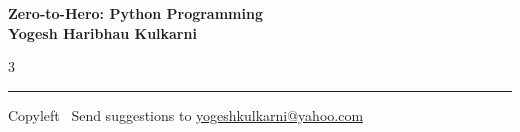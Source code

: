 \documentclass[8pt,landscape]{article}
\begin{document}
\footnotesize


\begin{center}
\Large{\textbf{Zero-to-Hero: Python Programming\\ Yogesh Haribhau Kulkarni}}  
\end{center}

\begin{multicols}{3}
	
\end{multicols}

\rule{\linewidth}{0.25pt}
\scriptsize
Copyleft \textcopyleft\  Send suggestions to 
\href{http://www.yogeshkulkarni.com}{yogeshkulkarni@yahoo.com}
\end{document}
